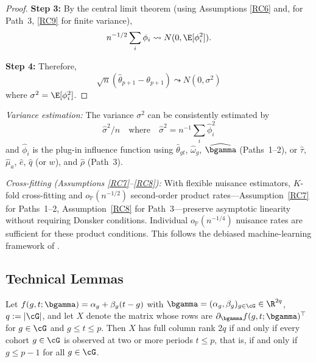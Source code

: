 \documentclass{article}
\renewcommand{\P}{\mathbb{P}}
\begin{document}
\begin{proof}
\textbf{Step 3:} By the central limit theorem (using Assumptions \ref{RC6} and, for Path~3, \ref{RC9} for finite variance),
\[
n^{-1/2}\sum_i \phi_i \leadsto N(0, \E[\phi_i^2]).
\]

\textbf{Step 4:} Therefore,
\[
\sqrt{n}(\widehat{\theta}_{p+1} - \theta_{p+1}) \leadsto N(0, \sigma^2)
\]
where $\sigma^2 = \E[\phi_i^2]$.
\end{proof}

\begin{remark}
\textit{Variance estimation:} The variance $\sigma^2$ can be consistently estimated by
\[
\widehat{\sigma}^2/n \quad \text{where} \quad \widehat{\sigma}^2 = n^{-1}\sum_i \widehat{\phi}_i^2
\]
and $\widehat{\phi}_i$ is the plug-in influence function using $\widehat{\theta}_{gt}$, $\widehat{\omega}_g$, $\widehat{\bgamma}$ (Paths~1--2), or $\widehat\tau$, $\widehat\mu_a$, $\widehat e$, $\widehat q$ (or $w$), and $\widehat\rho$ (Path~3).

\textit{Cross-fitting (Assumptions \ref{RC7}--\ref{RC8}):}
With flexible nuisance estimators, $K$-fold cross-fitting and
$o_{\P}(n^{-1/2})$ second-order product rates---Assumption~\ref{RC7} for Paths~1--2, Assumption~\ref{RC8} for Path~3---preserve asymptotic linearity without requiring Donsker conditions. Individual $o_{\P}(n^{-1/4})$ nuisance rates are sufficient for these product conditions. This follows the debiased machine-learning framework of \citet{chernozhukovDoubleDebiasedMachine2018}.
\end{remark}

\subsection{Technical Lemmas}\label{app:lemmas}

\begin{lemma}\label{lem:injectivity}
Let $f(g,t;\bgamma) = \alpha_g + \beta_g(t-g)$ with $\bgamma = (\alpha_g,\beta_g)_{g\in\cG} \in \R^{2q}$, $q := |\cG|$, and let $X$ denote the matrix whose rows are $\partial_{\bgamma} f(g,t;\bgamma)^{\top}$ for $g \in \cG$ and $g \leq t \leq p$. Then $X$ has full column rank $2q$ if and only if every cohort $g \in \cG$ is observed at two or more periods $t \leq p$, that is, if and only if $g \leq p-1$ for all $g \in \cG$.
\end{lemma}
\end{document}
